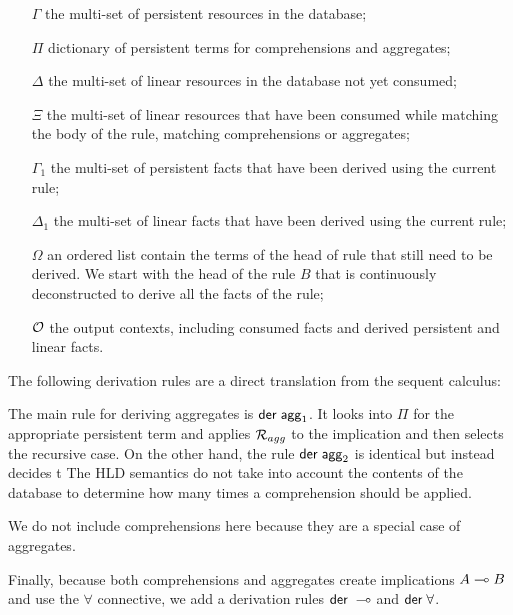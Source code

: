 \begin{enumerate}

   \item[$\Gamma$] the multi-set of persistent resources in the database;
   
   \item[$\Pi$] dictionary of persistent terms for comprehensions and
   aggregates;

   \item[$\Delta$] the multi-set of linear resources in the database not yet
   consumed;

   \item[$\Xi$] the multi-set of linear resources that have been consumed while
   matching the body of the rule, matching comprehensions or aggregates;

   \item[$\Gamma_1$] the multi-set of persistent facts that have been derived
   using the current rule;

   \item[$\Delta_1$] the multi-set of linear facts that have been derived using
   the current rule;

   \item[$\Omega$] an ordered list contain the terms of the head of rule that
   still need to be derived. We start with the head of the rule $B$ that is
   continuously deconstructed to derive all the facts of the rule;

   \item[$\mathcal{O}$] the output contexts, including consumed facts and derived
   persistent and linear facts.

\end{enumerate}

The following derivation rules are a direct translation from the sequent
calculus:



The main rule for deriving aggregates is $\mathsf{der} \; \mathsf{agg}_1$. It looks into
$\Pi$ for the appropriate persistent term and applies $\mathcal{R}_{agg}$ to the
implication and then selects the recursive case. On the other hand, the rule
$\mathsf{der} \; \mathsf{agg}_2$ is identical but instead decides t The HLD semantics do not
take into account the contents of the database to determine how many times a
comprehension should be applied.



We do not include comprehensions here because they are a special case of
aggregates.

Finally, because both comprehensions and aggregates create implications $A \multimap
B$ and use the $\forall$ connective, we add a derivation rules $\mathsf{der} \; \multimap$
and $\mathsf{der} \; \forall$.


